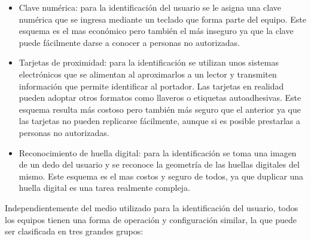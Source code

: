 \begin{itemize}
	\item Clave numérica: para la identificación del usuario se le asigna una clave numérica que se ingresa mediante un teclado que forma parte del equipo. Este esquema es el mas económico pero también el más inseguro ya que la clave puede fácilmente darse a conocer a personas no autorizadas. 
	\item Tarjetas de proximidad: para la identificación se utilizan unos sistemas electrónicos que se alimentan al aproximarlos a un lector y transmiten información que permite identificar al portador. Las tarjetas en realidad pueden adoptar otros formatos como llaveros o etiquetas autoadhesivas. Este esquema resulta más costoso pero también más seguro que el anterior ya que las tarjetas no pueden replicarse fácilmente, aunque si es posible prestarlas a personas no autorizadas.
	\item Reconocimiento de huella digital: para la identificación se toma una imagen de un dedo del usuario y se reconoce la geometría de las huellas digitales del mismo. Este esquema es el mas costos y seguro de todos, ya que duplicar una huella digital es una tarea realmente compleja.
\end{itemize}

Independientemente del medio utilizado para la identificación del usuario, todos los equipos tienen una forma de operación y configuración similar, la que puede ser clasificada en tres grandes grupos:

